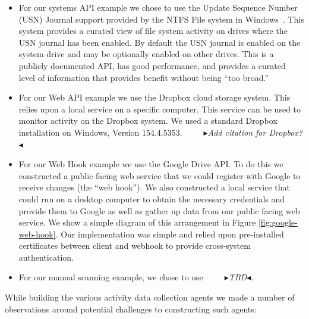 \documentclass[sigconf,anonymous,review]{acmart}
\newcommand{\nbc}[3]{
 {\colorbox{#3}{\bfseries\sffamily\scriptsize\textcolor{white}{#1}}}
 {\textcolor{#3}{\sf\small$\blacktriangleright$\textit{#2}$\blacktriangleleft$}}}
\newcommand\tm[1]{\nbc{TM}{#1}{tmcolor}}
\begin{document}
\begin{itemize}
    \item For our systems API example we chose to use the Update Sequence Number
    (USN) Journal support provided by the NTFS File system in
    Windows~\cite{huang2012research}.  This system provides a curated view of
    file system activity on drives where the USN journal has been enabled. By
    default the USN journal is enabled on the system drive and may be optionally
    enabled on other drives.  This is a publicly documented API, has good
    performance, and provides a curated level of information that provides
    benefit without being ``too broad.''
    \item For our Web API example we use the Dropbox cloud storage
    system.  This relies upon a local service on a specific computer.  This
    service can be used to monitor activity on the Dropbox system.  We used a
    standard Dropbox installation on Windows, Version 154.4.5353. \tm{Add
    citation for Dropbox?}
    \item For our Web Hook example we use the Google Drive API.  To do this we
    constructed a public facing web service that we could
    register with Google to receive changes (the ``web hook'').  We also
    constructed a local service that could run on a desktop computer to obtain
    the necessary credentials and provide them to Google as well as gather up
    data from our public facing web service.  We show a simple diagram of this
    arrangement in Figure \ref{fig:google-web-hook}. Our implementation was
    simple and relied upon pre-installed certificates between client and webhook
    to provide cross-system authentication.
    \item For our manual scanning example, we chose to use \tm{TBD}.

\end{itemize}

While building the various activity data collection agents we made a number of
observations around potential challenges to constructing such agents:
\end{document}

